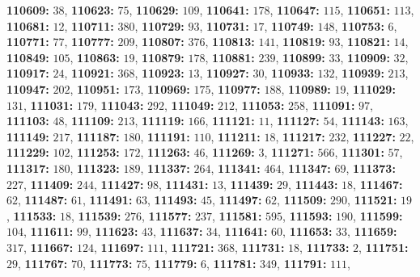 \textsf{\bfseries 110609:} $38$, \textsf{\bfseries 110623:} $75$, \textsf{\bfseries 110629:} $109$, \textsf{\bfseries 110641:} $178$, \textsf{\bfseries 110647:} $115$, \textsf{\bfseries 110651:} $113$, \textsf{\bfseries 110681:} $12$, \textsf{\bfseries 110711:} $380$, \textsf{\bfseries 110729:} $93$, \textsf{\bfseries 110731:} $17$, \textsf{\bfseries 110749:} $148$, \textsf{\bfseries 110753:} $6$, \textsf{\bfseries 110771:} $77$, \textsf{\bfseries 110777:} $209$, \textsf{\bfseries 110807:} $376$, \textsf{\bfseries 110813:} $141$, \textsf{\bfseries 110819:} $93$, \textsf{\bfseries 110821:} $14$, \textsf{\bfseries 110849:} $105$, \textsf{\bfseries 110863:} $19$, \textsf{\bfseries 110879:} $178$, \textsf{\bfseries 110881:} $239$, \textsf{\bfseries 110899:} $33$, \textsf{\bfseries 110909:} $32$, \textsf{\bfseries 110917:} $24$, \textsf{\bfseries 110921:} $368$, \textsf{\bfseries 110923:} $13$, \textsf{\bfseries 110927:} $30$, \textsf{\bfseries 110933:} $132$, \textsf{\bfseries 110939:} $213$, \textsf{\bfseries 110947:} $202$, \textsf{\bfseries 110951:} $173$, \textsf{\bfseries 110969:} $175$, \textsf{\bfseries 110977:} $188$, \textsf{\bfseries 110989:} $19$, \textsf{\bfseries 111029:} $131$, \textsf{\bfseries 111031:} $179$, \textsf{\bfseries 111043:} $292$, \textsf{\bfseries 111049:} $212$, \textsf{\bfseries 111053:} $258$, \textsf{\bfseries 111091:} $97$, \textsf{\bfseries 111103:} $48$, \textsf{\bfseries 111109:} $213$, \textsf{\bfseries 111119:} $166$, \textsf{\bfseries 111121:} $11$, \textsf{\bfseries 111127:} $54$, \textsf{\bfseries 111143:} $163$, \textsf{\bfseries 111149:} $217$, \textsf{\bfseries 111187:} $180$, \textsf{\bfseries 111191:} $110$, \textsf{\bfseries 111211:} $18$, \textsf{\bfseries 111217:} $232$, \textsf{\bfseries 111227:} $22$, \textsf{\bfseries 111229:} $102$, \textsf{\bfseries 111253:} $172$, \textsf{\bfseries 111263:} $46$, \textsf{\bfseries 111269:} $3$, \textsf{\bfseries 111271:} $566$, \textsf{\bfseries 111301:} $57$, \textsf{\bfseries 111317:} $180$, \textsf{\bfseries 111323:} $189$, \textsf{\bfseries 111337:} $264$, \textsf{\bfseries 111341:} $464$, \textsf{\bfseries 111347:} $69$, \textsf{\bfseries 111373:} $227$, \textsf{\bfseries 111409:} $244$, \textsf{\bfseries 111427:} $98$, \textsf{\bfseries 111431:} $13$, \textsf{\bfseries 111439:} $29$, \textsf{\bfseries 111443:} $18$, \textsf{\bfseries 111467:} $62$, \textsf{\bfseries 111487:} $61$, \textsf{\bfseries 111491:} $63$, \textsf{\bfseries 111493:} $45$, \textsf{\bfseries 111497:} $62$, \textsf{\bfseries 111509:} $290$, \textsf{\bfseries 111521:} $19$, \textsf{\bfseries 111533:} $18$, \textsf{\bfseries 111539:} $276$, \textsf{\bfseries 111577:} $237$, \textsf{\bfseries 111581:} $595$, \textsf{\bfseries 111593:} $190$, \textsf{\bfseries 111599:} $104$, \textsf{\bfseries 111611:} $99$, \textsf{\bfseries 111623:} $43$, \textsf{\bfseries 111637:} $34$, \textsf{\bfseries 111641:} $60$, \textsf{\bfseries 111653:} $33$, \textsf{\bfseries 111659:} $317$, \textsf{\bfseries 111667:} $124$, \textsf{\bfseries 111697:} $111$, \textsf{\bfseries 111721:} $368$, \textsf{\bfseries 111731:} $18$, \textsf{\bfseries 111733:} $2$, \textsf{\bfseries 111751:} $29$, \textsf{\bfseries 111767:} $70$, \textsf{\bfseries 111773:} $75$, \textsf{\bfseries 111779:} $6$, \textsf{\bfseries 111781:} $349$, \textsf{\bfseries 111791:} $111$, 
